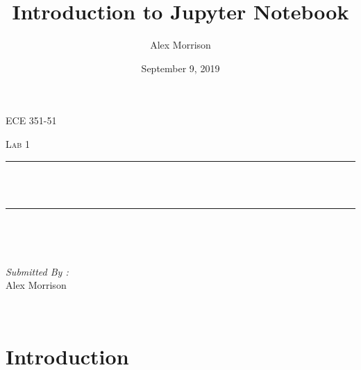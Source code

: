 \documentclass[12pt]{report}
\title{Introduction to Jupyter Notebook}
\author{ Alex Morrison}
\date{September 9, 2019}
\makeatletter
\let\thetitle\@title
\makeatother
\begin{document}

\begin{titlepage}
	\centering
    \vspace*{0.5 cm}
\begin{center}    \textsc{\Large ECE 351-51}\\[2.0 cm]	\end{center}%
	\textsc{\Large  Lab 1}\\[0.5 cm]				%
	\rule{\linewidth}{0.2 mm} \\[0.4 cm]
	{ \huge \bfseries \thetitle}\\
	\rule{\linewidth}{0.2 mm} \\[1.5 cm]
	
	\begin{minipage}{0.4\textwidth}
		\begin{flushleft} \large
			\end{flushleft}
			\end{minipage}~
			\begin{minipage}{0.4\textwidth}
            
			\begin{flushright} \large
			\emph{Submitted By :} \\
			Alex Morrison  
		\end{flushright}
           
	\end{minipage}\\[2 cm]
	
\end{titlepage}


\tableofcontents
\pagebreak

\renewcommand{\thesection}{\arabic{section}}
\section{Introduction}
 
\end{document}
